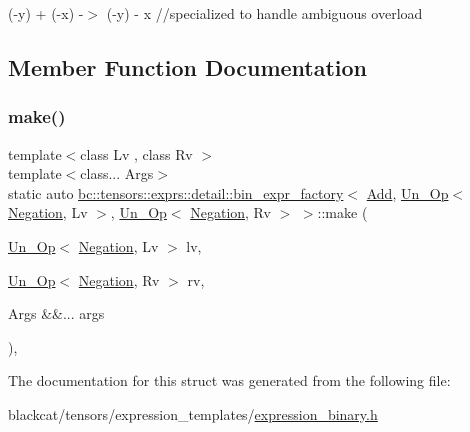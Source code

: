 (-\/y) + (-\/x) -\/$>$ (-\/y) -\/ x //specialized to handle ambiguous overload 

\subsection{Member Function Documentation}
\mbox{\label{structbc_1_1tensors_1_1exprs_1_1detail_1_1bin__expr__factory_3_01Add_00_01Un__Op_3_01Negation_00d86892bae805f04f4b10908e626a3cb5_a4fbf9c3516c874ac3aaa77d22a167694}} 
\subsubsection{\texorpdfstring{make()}{make()}}
{\footnotesize\ttfamily template$<$class Lv , class Rv $>$ \\
template$<$class... Args$>$ \\
static auto \hyperlink{structbc_1_1tensors_1_1exprs_1_1detail_1_1bin__expr__factory}{bc\+::tensors\+::exprs\+::detail\+::bin\+\_\+expr\+\_\+factory}$<$ \hyperlink{structbc_1_1oper_1_1Add}{Add}, \hyperlink{structbc_1_1tensors_1_1exprs_1_1Un__Op}{Un\+\_\+\+Op}$<$ \hyperlink{structbc_1_1oper_1_1Negation}{Negation}, Lv $>$, \hyperlink{structbc_1_1tensors_1_1exprs_1_1Un__Op}{Un\+\_\+\+Op}$<$ \hyperlink{structbc_1_1oper_1_1Negation}{Negation}, Rv $>$ $>$\+::make (\begin{DoxyParamCaption}\item[{\hyperlink{structbc_1_1tensors_1_1exprs_1_1Un__Op}{Un\+\_\+\+Op}$<$ \hyperlink{structbc_1_1oper_1_1Negation}{Negation}, Lv $>$}]{lv,  }\item[{\hyperlink{structbc_1_1tensors_1_1exprs_1_1Un__Op}{Un\+\_\+\+Op}$<$ \hyperlink{structbc_1_1oper_1_1Negation}{Negation}, Rv $>$}]{rv,  }\item[{Args \&\&...}]{args }\end{DoxyParamCaption})\hspace{0.3cm}{\ttfamily [inline]}, {\ttfamily [static]}}



The documentation for this struct was generated from the following file\+:\begin{DoxyCompactItemize}
\item 
blackcat/tensors/expression\+\_\+templates/\hyperlink{expression__binary_8h}{expression\+\_\+binary.\+h}\end{DoxyCompactItemize}
